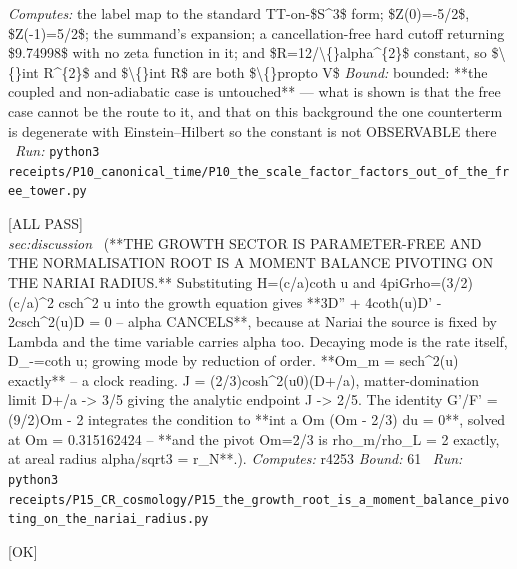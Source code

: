 \begin{description}
\emph{Computes:} the label map to the standard TT-on-\$S\textasciicircum{}3\$ form; \$Z(0)=-5/2\$, \$Z(-1)=5/2\$; the summand's expansion; a cancellation-free hard cutoff returning \$9.74998\$ with no zeta function in it; and \$R=12/\textbackslash\{\}alpha\textasciicircum{}\{2\}\$ constant, so \$\textbackslash\{\}int R\textasciicircum{}\{2\}\$ and \$\textbackslash\{\}int R\$ are both \$\textbackslash\{\}propto V\$
 \emph{Bound:} bounded: **the coupled and non-adiabatic case is untouched** --- what is shown is that the free case cannot be the route to it, and that on this background the one counterterm is degenerate with Einstein--Hilbert so the constant is not OBSERVABLE there
\ \emph{Run:} \texttt{python3 receipts/P10\_canonical\_time/P10\_the\_scale\_factor\_factors\_out\_of\_the\_free\_tower.py}
\item[\label{rcpt:P15_the_growth_root_is_a_moment_balance_pivoting_on_the_nariai_radius}\texttt{P15\_the\_growth\_root\_is\_a\_moment\_balance\_pivoting\_on\_the\_nariai\_radius}]\hfill\textsf{[ALL PASS]}\\
\textit{sec:discussion} \ (**THE GROWTH SECTOR IS PARAMETER-FREE AND THE NORMALISATION ROOT IS A MOMENT BALANCE PIVOTING ON THE NARIAI RADIUS.** Substituting H=(c/a)coth u and 4piGrho=(3/2)(c/a)\textasciicircum{}2 csch\textasciicircum{}2 u into the growth equation gives **3D'' + 4coth(u)D' - 2csch\textasciicircum{}2(u)D = 0 -- alpha CANCELS**, because at Nariai the source is fixed by Lambda and the time variable carries alpha too. Decaying mode is the rate itself, D\_-=coth u; growing mode by reduction of order. **Om\_m = sech\textasciicircum{}2(u) exactly** -- a clock reading. J = (2/3)cosh\textasciicircum{}2(u0)(D+/a), matter-domination limit D+/a -> 3/5 giving the analytic endpoint J -> 2/5. The identity G'/F' = (9/2)Om - 2 integrates the condition to **int a Om (Om - 2/3) du = 0**, solved at Om = 0.315162424 -- **and the pivot Om=2/3 is rho\_m/rho\_L = 2 exactly, at areal radius alpha/sqrt3 = r\_N**.). 
\emph{Computes:} r4253
 \emph{Bound:} 61
\ \emph{Run:} \texttt{python3 receipts/P15\_CR\_cosmology/P15\_the\_growth\_root\_is\_a\_moment\_balance\_pivoting\_on\_the\_nariai\_radius.py}
\item[\label{rcpt:P15_the_growth_root_on_the_leaf_rate_is_not_a_moment_balance_and_the_gap_stands}\texttt{P15\_the\_growth\_root\_on\_the\_leaf\_rate\_is\_not\_a\_moment\_balance\_and\_the\_gap\_stands}]\hfill\textsf{[OK]}\\

\end{description}
